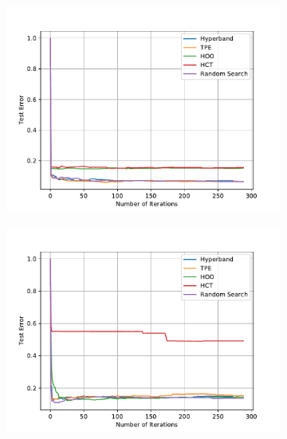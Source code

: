 \documentclass[twoside,11pt]{article}
\begin{document}
\begin{figure}
  \centering
  \begin{subfigure}[t]{0.3\textwidth}
    \centering\includegraphics[width=\textwidth]{img/uci/ada_0.pdf}
    \caption{\Ada}
  \end{subfigure}
  \begin{subfigure}[t]{0.3\textwidth}
    \centering\includegraphics[width=\textwidth]{img/uci/gbm_0.pdf}
    \caption{\GBM}
  \end{subfigure}
  \begin{subfigure}[t]{0.3\textwidth}

\end{subfigure}
\end{figure}
\end{document}
